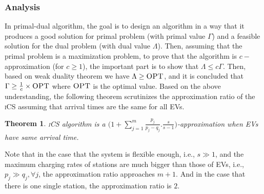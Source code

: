 \documentclass[journal]{IEEEtran}
\newcommand{\ics}{\textsc{iCS}\xspace}
\newcommand{\opt}{\textsc{OPT}\xspace}
\newtheorem{thm}{Theorem}
\begin{document}
		\subsubsection{Analysis}
		\label{subsec:analysis}
		In primal-dual algorithm, the goal is to design an algorithm in a way that it produces a good solution for primal problem (with primal value $\Gamma$) and a feasible solution for the dual problem (with dual value $\Lambda$). Then, assuming that the primal problem is a maximization problem, to prove that the algorithm is $c-$approximation (for $c\geq 1$), the important part is to show that $\Lambda\leq c\Gamma$. Then, based on weak duality theorem we have $\Lambda\geq \opt$, and it is concluded that $\Gamma \geq \frac{1}{c}\times\opt$ where $\opt$ is the optimal value. 
		Based on the above understanding, the following theorem scrutinizes the approximation ratio of the \ics assuming that arrival times are the same for all EVs. 
		
		\begin{thm}
			\label{thm:approx}
			\ics algorithm is a $\Big( 1+ \sum_{j=1}^m {\frac{p_j}{p_j-q_j}}.\frac{s}{s-1}\Big)$-approximation when EVs have same arrival time.
		\end{thm}
%		
		
		Note that in the case that the system is flexible enough, i.e., $s\gg 1$, and the maximum charging rates of stations are much bigger than those of EVs, i.e., $p_j \gg q_j, \forall j$, the approximation ratio approaches $m+1$. And in the case that there is one single station, the approximation ratio is $2$.

%
\end{document}
